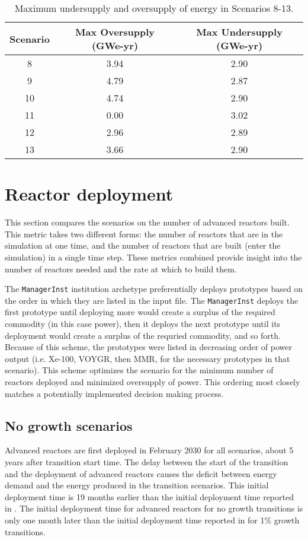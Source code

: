 \begin{table}
    \centering
    \caption{Maximum undersupply and oversupply of energy in Scenarios 8-13.}
    \label{tab:1percent_energy}
    \begin{tabular}{c c c}
        \hline 
        Scenario & Max Oversupply (GWe-yr) & Max Undersupply (GWe-yr) \\
        \hline 
        8 & 3.94 & 2.90 \\
        9 & 4.79 & 2.87 \\
        10 & 4.74 & 2.90 \\
        11 & 0.00 & 3.02 \\
        12 & 2.96 & 2.89 \\
        13 & 3.66 & 2.90\\
        \hline
        
    \end{tabular}
\end{table}

\section{Reactor deployment}
This section compares the scenarios on the number of advanced reactors 
built. This metric takes two 
different forms: the number of reactors that are in the simulation at 
one time, and the number of reactors that are built (enter the simulation)
in a single time step. These metrics combined provide insight into the 
number of reactors needed and the rate at which to build them. 

The \Cycamore \texttt{ManagerInst} institution archetype preferentially
deploys prototypes based on 
the order in which they are listed in the input file. The 
\texttt{ManagerInst} deploys the first prototype 
until deploying more would create a surplus of the required 
commodity (in this case power), then it deploys the next prototype 
until its deployment would create a surplus of the requried commodity, 
and so forth. 
Because of this scheme, the prototypes were listed in decreasing order of 
power 
output (i.e. Xe-100, VOYGR, then \gls{MMR}, for the necessary prototypes 
in that scenario). This scheme optimizes the scenario for the minimum 
number of reactors deployed and minimized oversupply of power. 
This ordering most closely 
matches a potentially implemented decision making process. 

\subsection{No growth scenarios}
Advanced reactors are first deployed in February 2030 for all scenarios, about 
5 years after transition start time. The delay between the start of the 
transition and the deployment of advanced reactors causes the deficit between 
energy demand and the energy produced in the transition scenarios. 
This initial deployment time is 
19 months earlier than the initial deployment time reported in 
\cite{bachmann_enrichment_2021}. The initial deployment time for advanced 
reactors for no growth transitions is only one month later than the 
initial deployment time reported in \cite{bachmann_enrichment_2021}
for 1\% growth transitions. 

